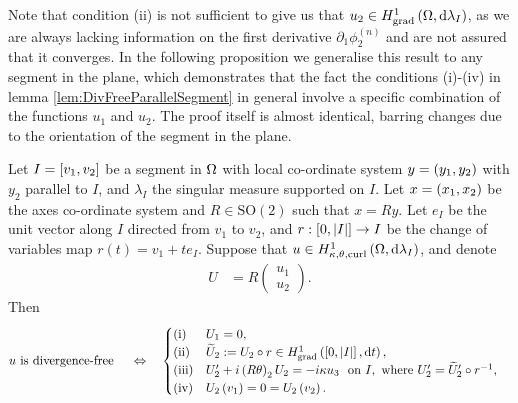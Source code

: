 Note that condition (ii) is not sufficient to give us that $u_2\in H^1_\mathrm{grad}\left( \Omega, \mathrm{d}\lambda_I \right)$, as we are always lacking information on the first derivative $\partial_1\phi_2^{(n)}$ and are not assured that it converges.
In the following proposition we generalise this result to any segment in the plane, which demonstrates that the fact the conditions (i)-(iv) in lemma \ref{lem:DivFreeParallelSegment} in general involve a specific combination of the functions $u_1$ and $u_2$.
The proof itself is almost identical, barring changes due to the orientation of the segment in the plane.

\begin{cory} \label{cory:DivFreeGeneralSegment}
	Let $I=\left[ v_1,v_2 \right]$ be a segment in $\Omega$ with local co-ordinate system $y=\left( y_1,y_2 \right)$ with $y_2$ parallel to $I$, and $\lambda_I$ the singular measure supported on $I$.
	Let $x=\left( x_1,x_2 \right)$ be the axes co-ordinate system and $R\in\mathrm{SO}(2)$ such that $x=Ry$.
	Let $e_I$ be the unit vector along $I$ directed from $v_1$ to $v_2$, and $r:\left[ 0,\left\lvert I \right\rvert \right]\rightarrow I$ be the change of variables map $r(t) = v_1 + te_I$.
	Suppose that $u\in H^1_{\kappa,\theta,\mathrm{curl}}\left( \Omega, \mathrm{d}\lambda_I \right)$, and denote
	\begin{align*}
		U &= R\begin{pmatrix} u_1 \\ u_2 \end{pmatrix}.
	\end{align*}
	Then
	\begin{align*}
		u \text{ is divergence-free } &\quad\Leftrightarrow\quad
		\begin{cases}
		\mathrm{(i)} & U_1 = 0, \\
		\mathrm{(ii)} & \widetilde{U}_2 := U_2 \circ r \in H^1_\mathrm{grad}\left( \left[ 0,\left\lvert I \right\rvert \right], \mathrm{d}t \right), \\
		\mathrm{(iii)} & U_2' + i\left( R\theta \right)_2 U_2 = -i\kappa u_3 \ \text{ on } I, \text{ where } U_2' = \widetilde{U}_2' \circ r^{-1}, \\
		\mathrm{(iv)} & U_2\left( v_1 \right) = 0 = U_2\left( v_2 \right).
		\end{cases}
	\end{align*}
\end{cory}
